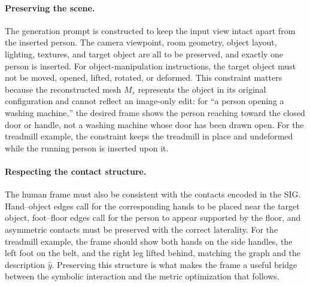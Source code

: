 \paragraph{Preserving the scene.} The generation prompt is constructed to keep the input view intact apart from the inserted person. The camera viewpoint, room geometry, object layout, lighting, textures, and target object are all to be preserved, and exactly one person is inserted. For object-manipulation instructions, the target object must not be moved, opened, lifted, rotated, or deformed. This constraint matters because the reconstructed mesh $M_s$ represents the object in its original configuration and cannot reflect an image-only edit: for ``a person opening a washing machine,'' the desired frame shows the person reaching toward the closed door or handle, not a washing machine whose door has been drawn open. For the treadmill example, the constraint keeps the treadmill in place and undeformed while the running person is inserted upon it.

\paragraph{Respecting the contact structure.} The human frame must also be consistent with the contacts encoded in the SIG. Hand--object edges call for the corresponding hands to be placed near the target object, foot--floor edges call for the person to appear supported by the floor, and asymmetric contacts must be preserved with the correct laterality. For the treadmill example, the frame should show both hands on the side handles, the left foot on the belt, and the right leg lifted behind, matching the graph and the description $\hat{y}$. Preserving this structure is what makes the frame a useful bridge between the symbolic interaction and the metric optimization that follows.

